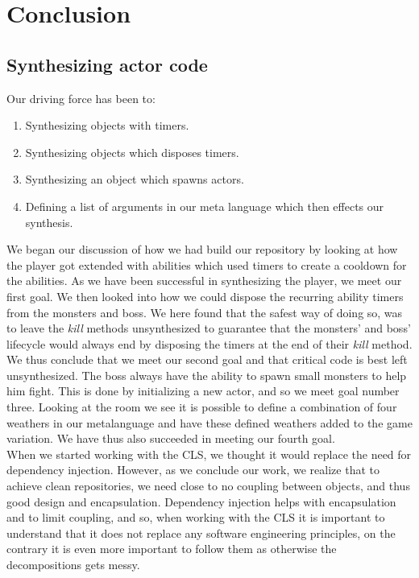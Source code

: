 \section{Conclusion}
\subsection{Synthesizing actor code}
Our driving force has been to:
\begin{enumerate}
	\item Synthesizing objects with timers.
	\item Synthesizing objects which disposes timers.
	\item Synthesizing an object which spawns actors.
	\item Defining a list of arguments in our meta language which then effects our synthesis. 
\end{enumerate}
We began our discussion of how we had build our repository by looking at how the player got extended with abilities which used timers to create a cooldown for the abilities. As we have been successful in synthesizing the player, we meet our first goal. We then looked into how we could dispose the recurring ability timers from the monsters and boss. We here found that the safest way of doing so, was to leave the \textit{kill} methods unsynthesized to guarantee that the monsters' and boss' lifecycle would always end by disposing the timers at the end of their \textit{kill} method. We thus conclude that we meet our second goal and that critical code is best left unsynthesized. The boss always have the ability to spawn small monsters to help him fight. This is done by initializing a new actor, and so we meet goal number three. Looking at the room we see it is possible to define a combination of four weathers in our metalanguage and have these defined weathers added to the game variation. We have thus also succeeded in meeting our fourth goal.\\
When we started working with the CLS, we thought it would replace the need for dependency injection. However, as we conclude our work, we realize that to achieve clean repositories, we need close to no coupling between objects, and thus good design and encapsulation. Dependency injection helps with encapsulation and to limit coupling, and so, when working with the CLS it is important to understand that it does not replace any software engineering principles, on the contrary it is even more important to follow them as otherwise the decompositions gets messy.\\
